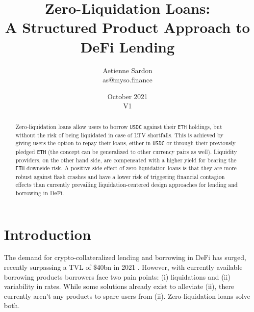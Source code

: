 \documentclass[a4paper]{article}
\title{Zero-Liquidation Loans:\\A Structured Product Approach to DeFi Lending}
\author{Aetienne Sardon\\\small{as@myso.finance}}
\date{October 2021\\\small{V1}}
\begin{document}
\maketitle




\begin{abstract}
Zero-liquidation loans allow users to borrow \verb|USDC| against their \verb|ETH| holdings, but without the risk of being liquidated in case of LTV shortfalls. This is achieved by giving users the option to repay their loans, either in \verb|USDC| or through their previously pledged \verb|ETH| (the concept can be generalized to other currency pairs as well). Liquidity providers, on the other hand side, are compensated with a higher yield for bearing the \verb|ETH| downside risk. A positive side effect of zero-liquidation loans is that they are more robust against flash crashes and have a lower risk of triggering financial contagion effects than currently prevailing liquidation-centered design approaches for lending and borrowing in DeFi. %
\end{abstract}

\section{Introduction}
The demand for crypto-collateralized lending and borrowing in DeFi has surged, recently surpassing a TVL of \$40bn in 2021 \cite{aave} \cite{compound}. However, with currently available borrowing products borrowers face two pain points: (i) liquidations and (ii) variability in rates. While some solutions already exist to alleviate (ii), there currently aren't any products to spare users from (ii). Zero-liquidation loans solve both.\\
\end{document}
